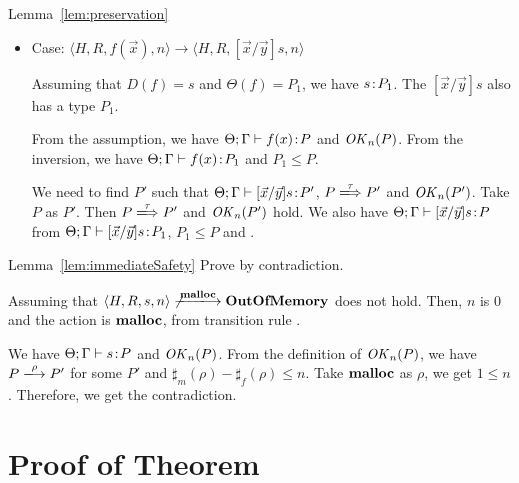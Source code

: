 \begin{pfof}{Lemma~\ref{lem:preservation}}
\begin{itemize}
\item Case: $\langle H, R, f(\vec{x}) , n \rangle \rightarrow  \langle H, R, [\vec{x}/\vec{y}]s, n  \rangle $

  Assuming that \(D(f) = s\) and \(\Theta(f) = P_1\), we have \(s\!:\!
  P_1\). The \([\vec{x}/\vec{y}]s\) also has a type \(P_1\).

  From the assumption, we have \(\Theta;\Gamma \vdash f(x)\!:\! P\) and
  \(\mathit{OK}_n(P)\). From the inversion, we have \(\Theta;\Gamma \vdash
  f(x)\!:\! P_1\) and \(P_1 \le P\).

  We need to find \(P'\) such that \(\Theta;\Gamma \vdash [\vec{x}/\vec{y}]s\!:\!
  P'\), \(P \xLongrightarrow{\tau} P'\) and \(\mathit{OK}_n(P')\). Take \(P\) as
  \(P'\). Then \(P \xLongrightarrow{\tau} P'\) and \(\mathit{OK}_n(P')\) hold. We
  also have \(\Theta;\Gamma \vdash [\vec{x}/\vec{y}]s\!:\! P \) from
  \(\Theta;\Gamma \vdash [\vec{x}/\vec{y}]s\!:\! P_1\), \(P_1 \le P\) and
  .

\end{itemize}

\end{pfof}


\begin{pfof}{Lemma~\ref{lem:immediateSafety}}
Prove by contradiction.

Assuming that \(\langle H, R, s, n \rangle
\not\xlongrightarrow{\Malloc} \OVERFLOW \) does not hold. Then, \(n\)
is \(0\) and the action is \(\mathbf{malloc}\), from transition rule
.

We have \(\Theta;\Gamma \vdash s \!:\! P\) and \(\mathit{OK}_n(P)\). From the
definition of \(\mathit{OK}_n(P)\), we have \(P \xlongrightarrow{\rho} P'\)
for some \(P'\) and \(\sharp_m(\rho) - \sharp_f(\rho) \le n \). Take
\(\mathbf{malloc}\) as \(\rho\), we get \( 1 \le n \). Therefore, we get the
contradiction.

\end{pfof}


\section{Proof of Theorem}

